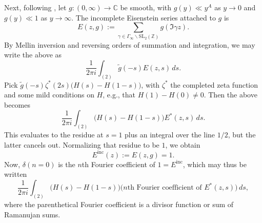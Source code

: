\documentclass[reqno]{amsart} 
\begin{document}
Next, following \cite{2012arXiv1210.1243N}, let $g :(0, \infty) \rightarrow \mathbb{C}$ be smooth, with $g(y) \ll y^A$ as $y \rightarrow 0$ and $g(y) \ll 1$ as $y \rightarrow \infty$.  The incomplete Eisenstein series attached to $g$ is
\begin{equation*}
  E(z, g) := \sum_{\gamma \in \Gamma_\infty \backslash \mathrm{SL}_2(\mathbb{Z})} g(\Im \gamma z).
\end{equation*}
By Mellin inversion and reversing orders of summation and integration, we may write the above as
\begin{equation*}
  \frac{1}{2 \pi i} \int_{(2)} \tilde{g}(- s) E(z, s) \, d s.
\end{equation*}
Pick $\tilde{g}(- s) \zeta^\ast(2 s) \bigl( H(s) - H(1 - s) \bigr)$, with $\zeta^\ast$ the completed zeta function and some mild conditions on $H$, e.g., that $H(1) - H(0) \neq 0$.  Then the above becomes
\begin{equation*}
  \frac{1}{2 \pi i} \int_{(2)} \bigl( H(s) - H(1 - s) \bigr) E^\ast(z, s) \, d s.
\end{equation*}
This evaluates to the residue at $s = 1$ plus an integral over the line $1/2$, but the latter cancels out.  Normalizing that residue to be $1$, we obtain
\begin{equation*}
  E^{\mathrm{inc}}(z) := E(z, g) = 1.
\end{equation*}
Now, $\delta(n = 0)$ is the $n$th Fourier coefficient of $1 = E^{\mathrm{inc}}$, which may thus be written
\begin{equation*}
  \frac{1}{2 \pi i} \int_{(2)}
  \bigl( H(s) - H(1 - s) \bigr)
  \bigl(\text{$n$th Fourier coefficient of $E^\ast(z, s)$}\bigr)
  \, d s,
\end{equation*}
where the parenthetical Fourier coefficient is a divisor function or sum of Ramanujan sums.
\end{document}
